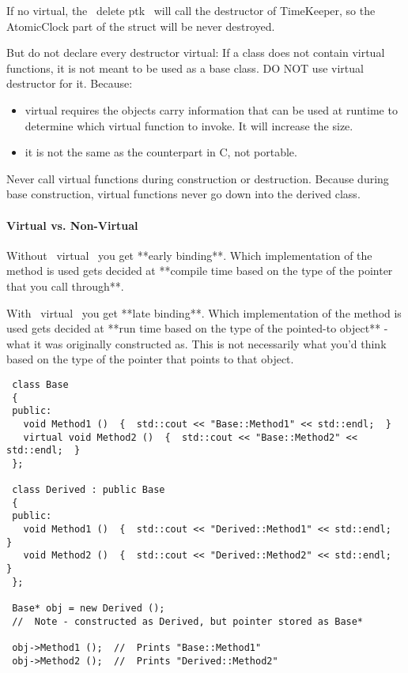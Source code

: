 If no virtual, the ~delete ptk~ will call the destructor of
TimeKeeper, so the AtomicClock part of the struct will be never
destroyed.

But do not declare every destructor virtual: If a class does not
contain virtual functions, it is not meant to be used as a base class.
DO NOT use virtual destructor for it. Because:
\begin{itemize}
\item virtual requires the objects carry information that can be used
  at runtime to determine which virtual function to invoke. It will
  increase the size.
\item it is not the same as the counterpart in C, not portable.
\end{itemize}

Never call virtual functions during construction or destruction.
Because during base construction, virtual functions never go down into
the derived class.

\paragraph{Virtual vs. Non-Virtual}

Without ~virtual~ you get **early binding**. Which implementation of
the method is used gets decided at **compile time based on the type of
the pointer that you call through**.

With ~virtual~ you get **late binding**. Which implementation of the
method is used gets decided at **run time based on the type of the
pointed-to object** - what it was originally constructed as. This is
not necessarily what you'd think based on the type of the pointer that
points to that object.

\begin{lstlisting}
 class Base
 {
 public:
   void Method1 ()  {  std::cout << "Base::Method1" << std::endl;  }
   virtual void Method2 ()  {  std::cout << "Base::Method2" << std::endl;  }
 };

 class Derived : public Base
 {
 public:
   void Method1 ()  {  std::cout << "Derived::Method1" << std::endl;  }
   void Method2 ()  {  std::cout << "Derived::Method2" << std::endl;  }
 };

 Base* obj = new Derived ();
 //  Note - constructed as Derived, but pointer stored as Base*

 obj->Method1 ();  //  Prints "Base::Method1"
 obj->Method2 ();  //  Prints "Derived::Method2"
\end{lstlisting}

